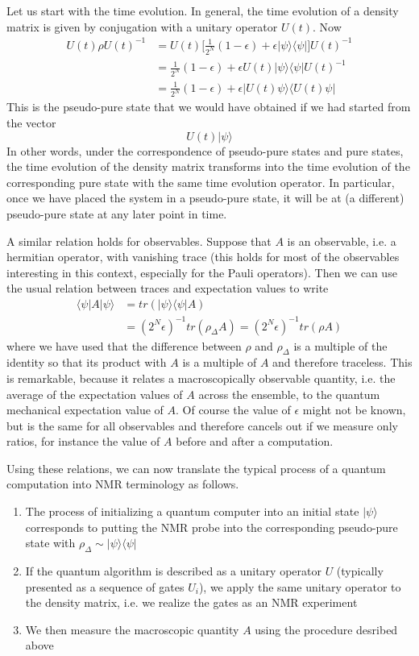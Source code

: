 \documentclass[a4paper, draft]{article}
\theoremstyle{own}
\theoremstyle{remark}
\begin{document}
Let us start with the time evolution. In general, the time evolution of a density matrix is given by conjugation with a unitary operator $U(t)$. Now
\begin{align*}
U(t) \rho U(t)^{-1} &= U(t) \big[   \frac{1}{2^N} (1-\epsilon) + \epsilon |\psi \rangle \langle \psi |  \big]U(t)^{-1} \\
&= \frac{1}{2^N} (1-\epsilon) + \epsilon U(t) |\psi \rangle \langle \psi | U(t)^{-1} \\
&= \frac{1}{2^N} (1-\epsilon) + \epsilon |U(t) \psi \rangle \langle U(t) \psi |
\end{align*}
This is the pseudo-pure state that we would have obtained if we had started from the vector
$$
U(t) |\psi \rangle
$$
In other words, under the correspondence of pseudo-pure states and pure states, the time evolution of the density matrix transforms into the time evolution of the corresponding pure state with the same time evolution operator. In particular, once we have placed the system in a pseudo-pure state, it will be at (a different) pseudo-pure state at any later point in time.

A similar relation holds for observables. Suppose that $A$ is an observable, i.e. a hermitian operator, with vanishing trace (this holds for most of the observables interesting in this context, especially for the Pauli operators). Then we can use the usual relation between traces and expectation values to write
\begin{align*}
\langle \psi | A | \psi \rangle &= tr (|\psi \rangle \langle \psi | A) \\
&=  (2^N \epsilon)^{-1} tr(\rho_{\Delta} A) =  (2^N\epsilon)^{-1} tr(\rho A)
\end{align*}
where we have used that the difference between $\rho$ and $\rho_{\Delta}$ is a multiple of the identity so that its product with $A$ is a multiple of $A$ and therefore traceless. This is remarkable, because it relates a macroscopically observable quantity, i.e. the average of the expectation values of $A$ across the ensemble, to the quantum mechanical expectation value of $A$. Of course the value of $\epsilon$ might not be known, but is the same for all observables and therefore cancels out if we measure only ratios, for instance the value of $A$ before and after a computation.

Using these relations, we can now translate the typical process of a quantum computation into NMR terminology as follows. 

\begin{enumerate}
	\item The process of initializing a quantum computer into an initial state $|\psi \rangle$ corresponds to putting the NMR probe into the corresponding pseudo-pure state with $\rho_{\Delta} \sim |\psi \rangle \langle \psi|$
	\item If the quantum algorithm is described as a unitary operator $U$ (typically presented as a sequence of gates $U_i$), we apply the same unitary operator to the density matrix, i.e. we realize the gates as an NMR experiment
	\item We then measure the macroscopic quantity $A$ using the procedure desribed above
\end{enumerate}
\end{document}
